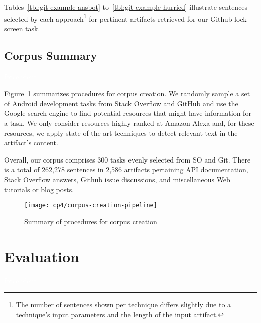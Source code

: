 Tables~\ref{tbl:git-example-ansbot} to~\ref{tbl:git-example-hurried}
illustrate sentences selected by each approach\footnote{The number of sentences shown per technique
differs slightly due to a technique's input parameters and the length of the input artifact.}
 for pertinent artifacts retrieved for our Github lock screen task. 










\subsection{Corpus Summary}
\textcolor{white}{force ident} %



Figure~\ref{fig:corpus-creation-pipeline} summarizes procedures for corpus creation.
We randomly sample a set of Android development tasks from Stack Overflow and GitHub
and use the Google search engine to find potential resources that might have
information for a task. We only consider resources highly ranked at Amazon Alexa and, for these resources, we apply state of the art techniques to detect relevant text in the artifact's content.



Overall, our corpus comprises 300 tasks evenly selected from SO and Git. 
There is a total of 262,278 sentences in 2,586 artifacts pertaining API documentation, Stack Overflow answers, Github issue discussions, and miscellaneous Web tutorials or blog posts. 



\begin{figure}
    \centering
    \texttt{[image: cp4/corpus-creation-pipeline]}
    \caption{Summary of procedures for corpus creation}
    \label{fig:corpus-creation-pipeline}
\end{figure}






\section{Evaluation}
\label{cp4:evaluation}
\textcolor{white}{force ident} %

